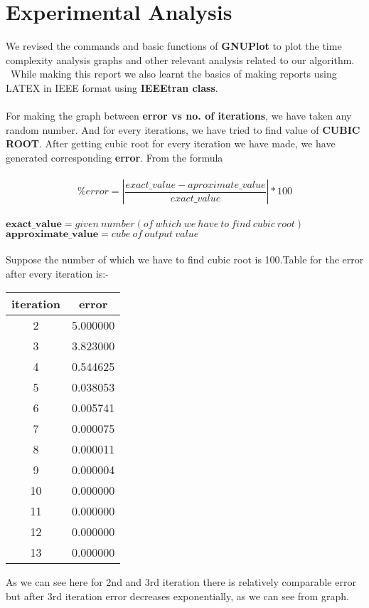 \documentclass[conference]{IEEEtran}
\begin{document}
\section{\textbf{Experimental Analysis}}
We revised the commands and basic functions of \textbf{GNUPlot}
to plot the time complexity analysis graphs and other relevant
analysis related to our algorithm.
\\
\	While making this report we also learnt the basics of
making reports using LATEX in IEEE format using \textbf{IEEEtran class}.
\\
\\
For making the graph between \textbf{error vs no. of iterations}, we have taken any random number.
And for every iterations, we have tried to find value of \textbf{CUBIC ROOT}. After getting cubic root for every iteration we have made, we have generated corresponding \textbf{error}. From the formula
\\
\\
$$ \%error = \left|{\frac{exact\_value - aproximate\_ value}{exact\_value}}\right|*100$$
\\
$ \textbf{exact\_value}  = given\  number(of\  which\  we \ have \ to \ find \ cubic\  root) $
\\
$ \textbf{approximate\_value} = cube \ of \ output\  value $
\\
\\
Suppose the  number of which we have to find cubic root is 100.Table for the error after every iteration is:-
\begin{table}[H]
\begin{center}
    \label{tab:table1}
    \begin{tabular}{|c|c|} %
    \hline
      \textbf{iteration} & \textbf{error} 
      \\
      \hline
       2 & 5.000000\\
      \hline
      3 & 3.823000\\
      \hline
      4 & 0.544625\\
      \hline
      5 & 0.038053\\
      \hline
	  6 & 0.005741\\
      \hline
	  7 & 0.000075\\
      \hline
      8 & 0.000011\\
      \hline
	   9 & 0.000004\\
       \hline
       10 & 0.000000\\
       \hline
	   11 & 0.000000\\
	   \hline
	    12 & 0.000000\\
		\hline
	    13 & 0.000000\\
        \hline
    \end{tabular}
\end{center}
\end{table}
As we can see here for 2nd and 3rd iteration there is relatively comparable error but after 3rd iteration error decreases exponentially, as we can see from graph.
\end{document}
